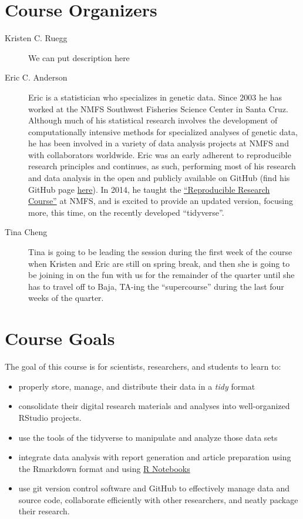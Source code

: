 \documentclass[]{book}
\providecommand{\tightlist}{%
  \setlength{\itemsep}{0pt}\setlength{\parskip}{0pt}}
\theoremstyle{definition}
\theoremstyle{definition}
\theoremstyle{remark}
\begin{document}
\section{Course Organizers}\label{course-organizers}

\begin{description}
\item[Kristen C. Ruegg]
We can put description here
\item[Eric C. Anderson]
Eric is a statistician who specializes in genetic data. Since 2003 he
has worked at the NMFS Southwest Fisheries Science Center in Santa Cruz.
Although much of his statistical research involves the development of
computationally intensive methods for specialized analyses of genetic
data, he has been involved in a variety of data analysis projects at
NMFS and with collaborators worldwide. Eric was an early adherent to
reproducible research principles and continues, as such, performing most
of his research and data analysis in the open and publicly available on
GitHub (find his GitHub page \href{https://github.com/eriqande}{here}).
In 2014, he taught the
\href{http://eriqande.github.io/rep-res-web/}{``Reproducible Research
Course''} at NMFS, and is excited to provide an updated version,
focusing more, this time, on the recently developed ``tidyverse''.
\item[Tina Cheng]
Tina is going to be leading the session during the first week of the
course when Kristen and Eric are still on spring break, and then she is
going to be joining in on the fun with us for the remainder of the
quarter until she has to travel off to Baja, TA-ing the ``supercourse''
during the last four weeks of the quarter.
\end{description}

\section{Course Goals}\label{course-goals}

The goal of this course is for scientists, researchers, and students to
learn to:

\begin{itemize}
\tightlist
\item
  properly store, manage, and distribute their data in a \emph{tidy}
  format
\item
  consolidate their digital research materials and analyses into
  well-organized RStudio projects.
\item
  use the tools of the tidyverse to manipulate and analyze those data
  sets
\item
  integrate data analysis with report generation and article preparation
  using the Rmarkdown format and using
  \href{http://rmarkdown.rstudio.com/r_notebooks.html}{R Notebooks}
\item
  use git version control software and GitHub to effectively manage data
  and source code, collaborate efficiently with other researchers, and
  neatly package their research.
\end{itemize}
\end{document}
